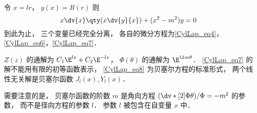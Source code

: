 令 $x = lr$，   $y(x) = R(r)$ 则
\begin{equation}\label{CylLap_eq8} 
x \dv{x} \qty(x\dv{y}{x}) + (x^2 - m^2)y = 0
\end{equation}
到此为止， 三个变量已经完全分离， 各自的微分方程为\autoref{CylLap_eq4}， \autoref{CylLap_eq6}，\autoref{CylLap_eq7}．

$Z(z)$ 的通解为 $C_1\E^{lz} + C_2 \E^{-lz}$，   $\Phi(\theta)$ 的通解为 $\E^{\I m\theta}$．   \autoref{CylLap_eq7} 的解不能用有限的初等函数表示， \autoref{CylLap_eq8} 为贝塞尔方程的标准形式， 两个线性无关解是贝塞尔函数 $J_l(x), Y_l(x)$．

需要注意的是， 贝塞尔函数的阶数 $m$ 是角向方程 $(\dv*[2]{\Phi}{\theta})/\Phi = -m^2$ 的参数， 而不是径向方程的参数 $l$． 参数 $l$ 被包含在自变量 $x$ 中．
